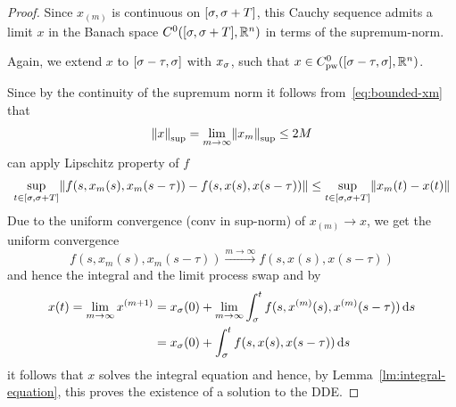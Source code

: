 \begin{proof}
        Since $x_{(m)}$ is continuous on $[\tzero,\tzero+T]$, this Cauchy
        sequence admits a limit $x$ in the Banach space $\continuouss[0]{[\tzero,\tzero+T]}{\R^n}$ in terms of the supremum-norm.

        Again, we extend $x$ to $[\tzero-\tau,\tzero]$ with $x_\tzero$, such that $x\in\Cnpw[0]{[\tzero-\tau,\tzero]}{\R^n}$.


        

        Since by the continuity of the supremum norm it follows from~\eqref{eq:bounded-xm} that
        \begin{equation*}
            \supnorm*{x}=\lim_{m\to\infty}\supnorm*{x_m}\leq 2M
        \end{equation*}
        can apply Lipschitz property of $f$
        \begin{equation*}
            \sup_{t\in\compactum{\tzero}{\tzero+T}}\nnorm*{f(s,x_m(s),x_m(s-\tau))-f(s,x(s),x(s-\tau))} \leq \sup_{t\in\compactum{\tzero}{\tzero+T}}\nnorm*{x_m(t)-x(t)}
        \end{equation*}
        Due to the uniform convergence (conv in sup-norm) of $x_{(m)}\to x$, we get the uniform convergence
        \begin{equation*}
            f(s,x_m(s),x_m(s-\tau)) \xrightarrow{m\to\infty} f(s,x(s),x(s-\tau))
        \end{equation*}
        and hence the integral and the limit process swap and by
        \begin{align*}
            x(t) = \lim_{m\to\infty} x^{(m+1)} &= x_\tzero(0) + \lim_{m\to\infty}\int_\tzero^t f(s,x^{(m)}(s),x^{(m)}(s-\tau))\dx[s]\\
            &= x_\tzero(0) + \int_\tzero^t f(s,x(s),x(s-\tau))\dx[s]
        \end{align*}
        it follows that $x$ solves the integral equation and hence, by Lemma~\ref{lm:integral-equation},
        this proves the existence of a solution to the DDE.


\end{proof}
